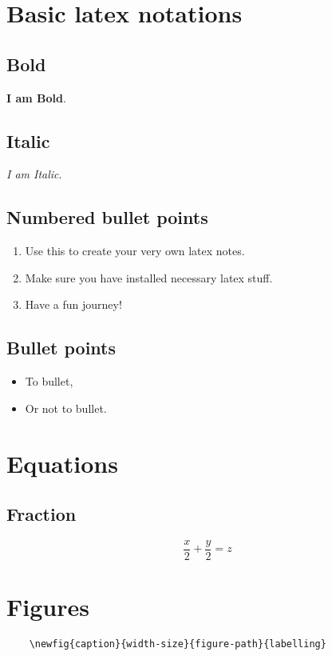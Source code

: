 \section{Basic latex notations}

\subsection*{Bold}

\textbf{I am Bold}.

\subsection*{Italic}

\textit{I am Italic}.

\subsection*{Numbered bullet points}
\begin{enumerate}
    \item Use this to create your very own latex notes.
    \item Make sure you have installed necessary latex stuff.
    \item Have a fun journey!
\end{enumerate}

\subsection*{Bullet points}
\begin{itemize}
    \item To bullet,
    \item Or not to bullet.
\end{itemize}


\section{Equations}

\subsection{Fraction}

\begin{equation}
    \frac{x}{2}+\frac{y}{2}=z
\end{equation}

\section{Figures}
\begin{verbatim}
    \newfig{caption}{width-size}{figure-path}{labelling}
\end{verbatim}

